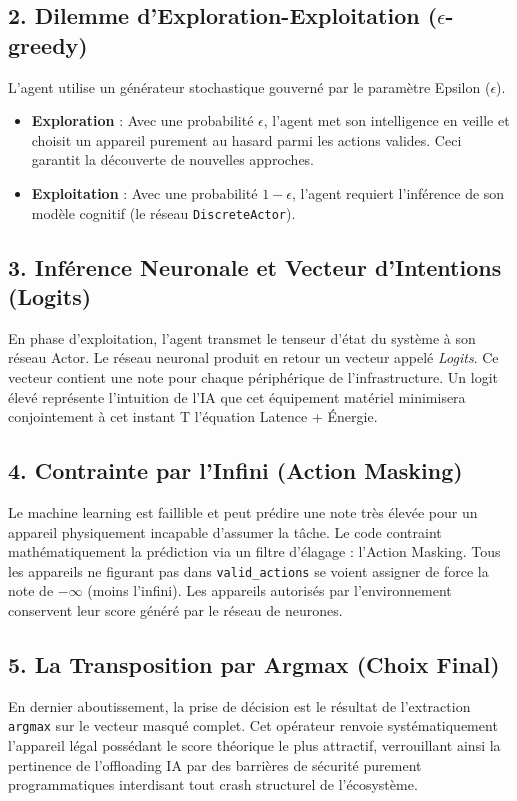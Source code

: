 \documentclass[12pt,a4paper]{article}
\begin{document}
\subsection{2. Dilemme d'Exploration-Exploitation ($\epsilon$-greedy)}
L'agent utilise un générateur stochastique gouverné par le paramètre Epsilon ($\epsilon$). 
\begin{itemize}
    \item \textbf{Exploration} : Avec une probabilité $\epsilon$, l'agent met son intelligence en veille et choisit un appareil purement au hasard parmi les actions valides. Ceci garantit la découverte de nouvelles approches.
    \item \textbf{Exploitation} : Avec une probabilité $1 - \epsilon$, l'agent requiert l'inférence de son modèle cognitif (le réseau \texttt{DiscreteActor}).
\end{itemize}

\subsection{3. Inférence Neuronale et Vecteur d'Intentions (Logits)}
En phase d'exploitation, l'agent transmet le tenseur d'état du système à son réseau Actor. Le réseau neuronal produit en retour un vecteur appelé \textit{Logits}. Ce vecteur contient une note pour chaque périphérique de l'infrastructure. Un logit élevé représente l'intuition de l'IA que cet équipement matériel minimisera conjointement à cet instant T l'équation Latence + Énergie.

\subsection{4. Contrainte par l'Infini (Action Masking)}
Le machine learning est faillible et peut prédire une note très élevée pour un appareil physiquement incapable d'assumer la tâche. Le code contraint mathématiquement la prédiction via un filtre d'élagage :
l'Action Masking.
Tous les appareils ne figurant pas dans \texttt{valid\_actions} se voient assigner de force la note de $-\infty$ (moins l'infini).
Les appareils autorisés par l'environnement conservent leur score généré par le réseau de neurones.

\subsection{5. La Transposition par Argmax (Choix Final)}
En dernier aboutissement, la prise de décision est le résultat de l'extraction \texttt{argmax} sur le vecteur masqué complet. 
Cet opérateur renvoie systématiquement l'appareil légal possédant le score théorique le plus attractif, verrouillant ainsi la pertinence de l'offloading IA par des barrières de sécurité purement programmatiques interdisant tout crash structurel de l'écosystème.
\end{document}
